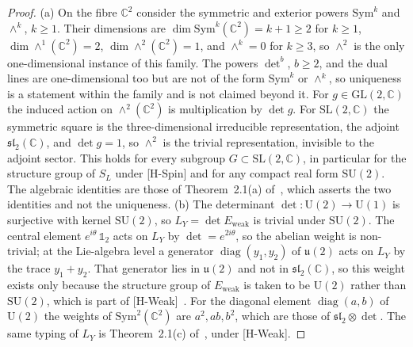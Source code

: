 \documentclass[11pt]{article}
\theoremstyle{definition}
\theoremstyle{remark}
\newcommand{\SW}{S_{L}}
\newcommand{\Ew}{E_{\mathrm{weak}}}
\newcommand{\LY}{L_{Y}}
\newcommand{\Sym}{\mathrm{Sym}}
\newcommand{\SU}{\mathrm{SU}}
\newcommand{\UU}{\mathrm{U}}
\newcommand{\SL}{\mathrm{SL}}
\newcommand{\GL}{\mathrm{GL}}
\newcommand{\diag}{\operatorname{diag}}
\begin{document}
    \begin{proof}
      (a) On the fibre $\mathbb{C}^{2}$ consider the symmetric and exterior powers $\Sym^{k}$ and $\wedge^{k}$,
      $k \geq 1$.
      Their dimensions are $\dim \Sym^{k}(\mathbb{C}^{2}) = k+1 \geq 2$ for $k \geq 1$,
      $\dim \wedge^{1}(\mathbb{C}^{2}) = 2$,
      $\dim \wedge^{2}(\mathbb{C}^{2}) = 1$, and $\wedge^{k} = 0$ for $k \geq 3$, so $\wedge^{2}$ is the only
      one-dimensional instance of this family.
      The powers $\det^{b}$, $b \geq 2$, and the dual lines are one-dimensional too but are not of the form $\Sym^{k}$
      or $\wedge^{k}$, so uniqueness is a statement within the family and is not claimed beyond it.
      For $g \in \GL(2,\mathbb{C})$ the induced action on $\wedge^{2}(\mathbb{C}^{2})$ is multiplication by $\det g$.
      For $\SL(2,\mathbb{C})$ the symmetric square is the three-dimensional irreducible representation, the adjoint
      $\mathfrak{sl}_{2}(\mathbb{C})$, and $\det g = 1$, so $\wedge^{2}$ is the trivial representation, invisible to the
      adjoint sector.
      This holds for every subgroup $G \subset \SL(2,\mathbb{C})$, in particular for the structure group of $\SW$ under
      [H-Spin] and for any compact real form $\SU(2)$.
      The algebraic identities are those of Theorem~2.1(a) of~\cite{Beau2026q14}, which asserts the two identities and
      not the uniqueness.
      (b) The determinant $\det\colon \UU(2) \to \UU(1)$ is surjective with kernel $\SU(2)$, so $\LY = \det \Ew$ is
      trivial
      under $\SU(2)$.
      The central element $e^{i\theta}\,\mathbb{1}_{2}$ acts on $\LY$ by $\det = e^{2i\theta}$, so the abelian weight is
      non-trivial; at the Lie-algebra level a generator $\diag(y_{1}, y_{2})$ of $\mathfrak{u}(2)$ acts on $\LY$ by the
      trace $y_{1} + y_{2}$.
      That generator lies in $\mathfrak{u}(2)$ and not in $\mathfrak{sl}_{2}(\mathbb{C})$, so this weight exists only
      because
      the structure group of $\Ew$ is taken to be $\UU(2)$ rather than $\SU(2)$, which is part of
      [H-Weak]~\cite{Beau2026q14}.
      For the diagonal element $\diag(a, b)$ of $\UU(2)$ the weights of $\Sym^{2}(\mathbb{C}^{2})$ are
      $a^{2}, ab, b^{2}$, which are those of $\mathfrak{sl}_{2} \otimes \det$.
      The same typing of $\LY$ is Theorem~2.1(c) of~\cite{Beau2026q14}, under [H-Weak].
    \end{proof}
\end{document}
